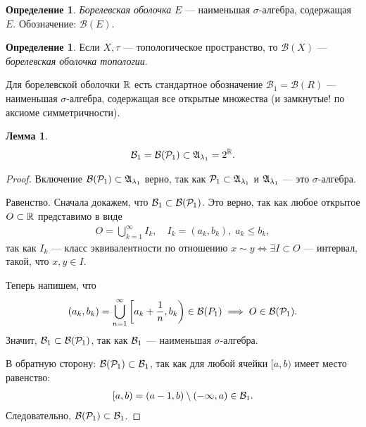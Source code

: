 \documentclass[a4paper,14pt]{extarticle}
\newcounter{theoremCnt}
\theoremstyle{definition}
\newtheorem{df}[theoremCnt]{Определение}
\theoremstyle{plain}
\theoremstyle{plain}
\newtheorem{lm}[theoremCnt]{Лемма}
\theoremstyle{plain}
\theoremstyle{plain}
\theoremstyle{definition}
\theoremstyle{definition}
\theoremstyle{definition}
\theoremstyle{definition}
\theoremstyle{definition}
\theoremstyle{definition}
\theoremstyle{plain}
\theoremstyle{plain}
\theoremstyle{plain}
\theoremstyle{plain}
\theoremstyle{definition}
\theoremstyle{definition}
\theoremstyle{definition}
\theoremstyle{definition}
\theoremstyle{definition}
\newcommand{\R}{\ensuremath \mathbb{R}}
\newcommand{\A}{\ensuremath \mathfrak{A}}
\newcommand{\p}{\ensuremath \mathcal{P}}
\begin{document}
\begin{df}
 \textit{Борелевская оболочка} $E$ --- наименьшая $\sigma$-алгебра, содержащая $E$. Обозначение: $\mathcal{B}(E)$.
\end{df}
\begin{df}
 Если $X, \tau$ --- топологическое пространство, то $\mathcal{B}(X)$ --- \textit{борелевская оболочка топологии}.

 Для борелевской оболочки $\R$ есть стандартное обозначение $\mathcal{B}_1 = \mathcal{B}(R)$ --- наименьшая $\sigma$-алгебра, содержащая все открытые множества (и замкнутые! по аксиоме симметричности).
\end{df}
\newcommand{\B}{\ensuremath \mathcal{B}}
\begin{lm}
 \begin{align*}
  \B_1 = \B( \p_1 ) \subset \A_{\lambda_1} = 2^{\R}
  .\end{align*}
\end{lm}
\begin{proof}
 Включение $\B(\p_1) \subset \A_{\lambda_1}$ верно, так как $\p_1 \subset \A_{\lambda_1}$ и $\A_{\lambda_1}$ --- это $\sigma$-алгебра.

 Равенство. Сначала докажем, что $\B_1 \subset \B(\p_1)$. Это верно, так как любое открытое $O \subset \R$ представимо в виде
 \begin{align*}
  O = \bigcup_{k=1}^{\infty} I_k, \quad I_k = (a_k, b_k),\; a_k \leqslant b_k
  ,\end{align*} так как $I_k$ --- класс эквивалентности по отношению $x \sim y \iff \exists I \subset O $ --- интервал, такой, что $x, y \in I$.

 Теперь напишем, что
 \begin{align*}
  (a_k, b_k) = \bigcup_{n=1}^{\infty} \left[a_k + \frac{1}{n}, b_k\right) \in \B(P_1) \implies O \in \B(\p_1)
  .\end{align*} Значит, $\B_1 \subset \B(\p_1)$, так как $\B_1$ --- наименьшая $\sigma$-алгебра.

 В обратную сторону: $\B(\p_1) \subset \B_1$, так как для любой ячейки $[a, b)$ имеет место равенство:
 \begin{align*}
  [a, b) = (a - 1, b) \setminus (-\infty, a) \in \B_1
  .\end{align*} Следовательно, $\B(\p_1) \subset \B_1$.
\end{proof}
\end{document}
